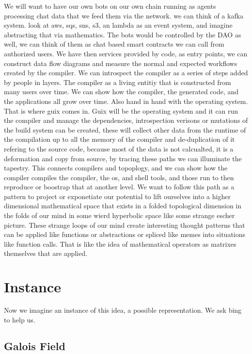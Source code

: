 \documentclass{article}
\begin{document}
We will want to have our own bots on our own chain running as agents processing chat data that we feed them via the network.
we can think of a kafka system.
look at aws, sqs, sns, s3, an lambda as an event system, and imagine abstracting that via mathematics.
The bots would be controlled by the DAO as well, we can think of them as chat based smart contracts we can call from authorized users.
We have then services provided by code, as entry points, we can construct data flow diagrams and measure the normal and expected workflows created by the compiler.
We can introspect the compiler as a series of steps added by people in layers.
The compiler as a living entitiy that is constructed from many users over time.
We can show how the compiler, the generated code, and the applications all grow over time. Also hand in hand with the operating system.
That is where guix comes in.
Guix will be the operating system and it can run the compiler and manage the dependencies, introspection verisons or mutations of the build system can be created, these will collect other data from the runtime of the compilation up to all the memory of the compiler and de-duplication of it refering to the source code, because most of the data is not calcualted, it is a deformation and copy from source,
by tracing these paths we can illuminate the tapestry.
This connects compilers and topoplogy, and we can show how the compiler compiles the compiler, the os, and shell tools, and those run to then reproduce or boostrap that at another level. We want to follow this path as a pattern to project or exponetiate our potential to lift ourselves into a higher dimensional mathematical space that exists in a folded topological dimension in the folds of our mind in some wierd hyperbolic space like some strange escher picture.
These strange loops of our mind create interesting thought patterns that can be applied like functions or abstractions or spliced like memes into situations like function calls. That is like the idea of mathematical operators as matrixes themselves that are applied.

\section{Instance}

Now we imagine an instance of this idea,
a possible representation. We ask bing to help us.

\subsection{Galois Field}
\end{document}
